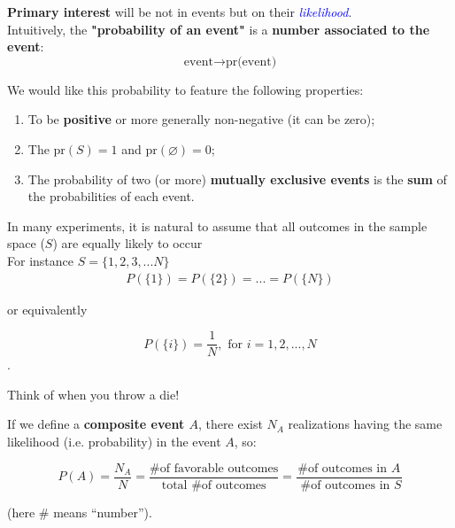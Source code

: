 \documentclass[notes=show]{beamer}\usepackage[]{graphicx}\usepackage[]{color}
\newcommand{\bea}{\begin{eqnarray}}
\newcommand{\eea}{\end{eqnarray}}
\begin{document}
\begin{frame}{\secname}

\textbf{Primary interest} will be not in events  but on their \textcolor{blue}{\textit{likelihood}}.\\[0.5em]
\pause
Intuitively, the \textbf{"probability of an event"} is a \textbf{number associated to the event}:\\[0.5em]

$$\text{event} \rightarrow \text{pr(event)}$$

\pause
We would like this probability to feature the following properties:

\begin{enumerate}
\item To be \textbf{positive} or more generally non-negative (it can be zero);
\pause
\item The $\text{pr}(S)=1$ and $\text{pr}(\varnothing)=0$;
\pause
\item The probability of two (or more) \textbf{mutually exclusive events} is the \textbf{sum} of the probabilities of each event.
\end{enumerate}

\end{frame}

\begin{frame}{\secname}

In many experiments, it is natural to assume that all outcomes in the sample space ($S$) are equally likely to occur\\[0.5em]

For instance $S=\{1,2,3,...N\}$\\[0.5em]
\pause
\bea
P(\{1\})=P(\{2\})=...=P(\{N\}) \nonumber
\eea

or equivalently

$$P(\{i\})= \frac{1}{N}, \text{ for } i=1,2,...,N$$.

\pause

\begin{example}
\begin{center}
Think of when you throw a die!
\end{center}
\end{example}
\end{frame}


\begin{frame}{\secname}

If we define a \textbf{composite event $A$}, there exist $N_A$ realizations having the same likelihood (i.e. probability) in the event $A$, so:

$$\boxed{P(A)=\frac{N_A}{N}=\frac{\mbox{\# of favorable outcomes}}{\mbox{total \# of outcomes}}=\frac{\mbox{\# of outcomes in $A$}}{\mbox{ \# of outcomes in $S$}}}$$

(here $\# $ means ``number'').

\end{frame}
\end{document}
